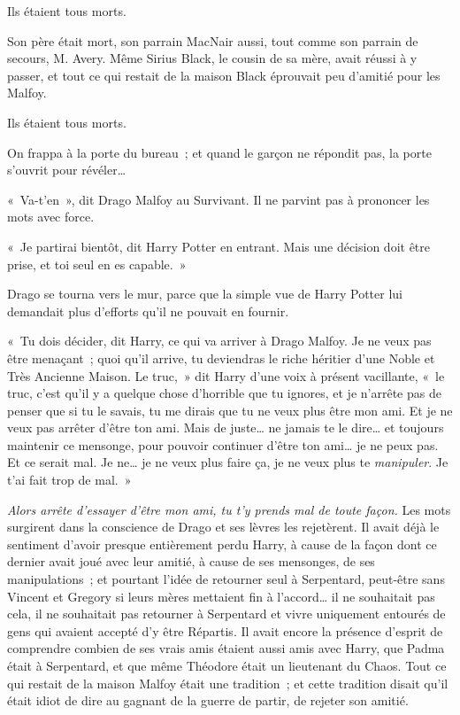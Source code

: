 Ils étaient tous morts.

Son père était mort, son parrain MacNair aussi, tout comme son parrain de secours, M. Avery.
Même Sirius Black, le cousin de sa mère, avait réussi à y passer, et tout ce qui restait de la maison Black éprouvait peu d'amitié pour les Malfoy.

Ils étaient tous morts.

On frappa à la porte du bureau~; et quand le garçon ne répondit pas, la porte s'ouvrit pour révéler…

«~Va-t'en~», dit Drago Malfoy au Survivant.
Il ne parvint pas à prononcer les mots avec force.

«~Je partirai bientôt, dit Harry Potter en entrant.
Mais une décision doit être prise, et toi seul en es capable.~»

Drago se tourna vers le mur, parce que la simple vue de Harry Potter lui demandait plus d'efforts qu'il ne pouvait en fournir.

«~Tu dois décider, dit Harry, ce qui va arriver à Drago Malfoy.
Je ne veux pas être menaçant~; quoi qu'il arrive, tu deviendras le riche héritier d'une Noble et Très Ancienne Maison.
Le truc,~» dit Harry d'une voix à présent vacillante, «~le truc, c'est qu'il y a quelque chose d'horrible que tu ignores, et je n'arrête pas de penser que si tu le savais, tu me dirais que tu ne veux plus être mon ami.
Et je ne veux pas arrêter d'être ton ami.
Mais de juste… ne jamais te le dire… et toujours maintenir ce mensonge, pour pouvoir continuer d'être ton ami… je ne peux pas.
Et ce serait mal.
Je ne… je ne veux plus faire ça, je ne veux plus te \emph{manipuler}.
Je t'ai fait trop de mal.~»

\emph{Alors arrête d'essayer d'être mon ami, tu t'y prends mal de toute façon.} Les mots surgirent dans la conscience de Drago et ses lèvres les rejetèrent.
Il avait déjà le sentiment d'avoir presque entièrement perdu Harry, à cause de la façon dont ce dernier avait joué avec leur amitié, à cause de ses mensonges, de ses manipulations~; et pourtant l'idée de retourner seul à Serpentard, peut-être sans Vincent et Gregory si leurs mères mettaient fin à l'accord… il ne souhaitait pas cela, il ne souhaitait pas retourner à Serpentard et vivre uniquement entourés de gens qui avaient accepté d'y être Répartis.
Il avait encore la présence d'esprit de comprendre combien de ses vrais amis étaient aussi amis avec Harry, que Padma était à Serpentard, et que même Théodore était un lieutenant du Chaos.
Tout ce qui restait de la maison Malfoy était une tradition~; et cette tradition disait qu'il était idiot de dire au gagnant de la guerre de partir, de rejeter son amitié.


